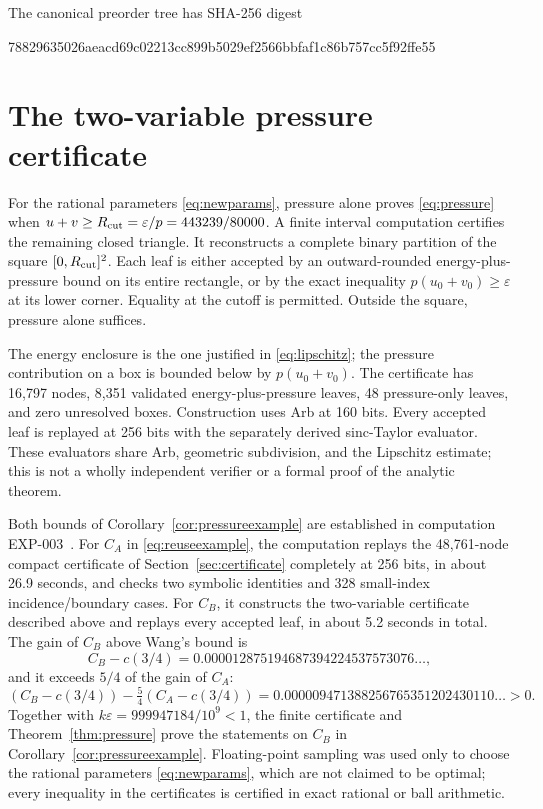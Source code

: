 \documentclass[11pt]{article}
\theoremstyle{remark}
\begin{document}
The canonical preorder tree has SHA-256 digest
\begin{center}\small\ttfamily
78829635026aeacd69c02213cc899b5029ef2566bbfaf1c86b757cc5f92ffe55
\end{center}

\section{The two-variable pressure certificate}\label{sec:pressurecert}

For the rational parameters \eqref{eq:newparams}, pressure alone proves
\eqref{eq:pressure} when $u+v\ge R_{\rm cut}=\varepsilon/p=443239/80000$.
A finite interval computation certifies the remaining closed triangle. It
reconstructs a complete binary partition of the square
$[0,R_{\rm cut}]^2$. Each leaf is either accepted by an outward-rounded
energy-plus-pressure bound on its entire rectangle, or by the exact
inequality $p(u_0+v_0)\ge\varepsilon$ at its lower corner. Equality at
the cutoff is permitted. Outside the square, pressure alone suffices.

The energy enclosure is the one justified in \eqref{eq:lipschitz}; the
pressure contribution on a box is bounded below by $p(u_0+v_0)$.
The certificate has 16,797 nodes, 8,351 validated energy-plus-pressure
leaves, 48 pressure-only leaves, and zero unresolved boxes. Construction
uses Arb at 160 bits. Every accepted leaf is replayed at 256 bits with the
separately derived sinc-Taylor evaluator. These evaluators share Arb,
geometric subdivision, and the Lipschitz estimate; this is not a wholly
independent verifier or a formal proof of the analytic theorem.

Both bounds of Corollary~\ref{cor:pressureexample} are established in
computation EXP-003~\cite{RecordIII}. For $C_A$ in \eqref{eq:reuseexample},
the computation replays the 48,761-node compact certificate of
Section~\ref{sec:certificate} completely at 256 bits, in about 26.9
seconds, and checks two symbolic identities and 328 small-index
incidence\slash boundary cases. For $C_B$, it constructs the two-variable
certificate described above and replays every accepted leaf, in about 5.2
seconds in total. The gain of $C_B$ above Wang's bound is
\[
 C_B-c(3/4)=0.000012875194687394224537573076\ldots,
\]
and it exceeds $5/4$ of the gain of $C_A$:
\[
 (C_B-c(3/4))-\tfrac54(C_A-c(3/4))
 =0.000009471388256765351202430110\ldots>0.
\]
Together with $k\varepsilon=999947184/10^9<1$, the finite certificate and
Theorem~\ref{thm:pressure} prove the statements on $C_B$ in
Corollary~\ref{cor:pressureexample}. Floating-point sampling was used only
to choose the rational parameters \eqref{eq:newparams}, which are not
claimed to be optimal; every inequality in the certificates is certified in
exact rational or ball arithmetic.
\end{document}

